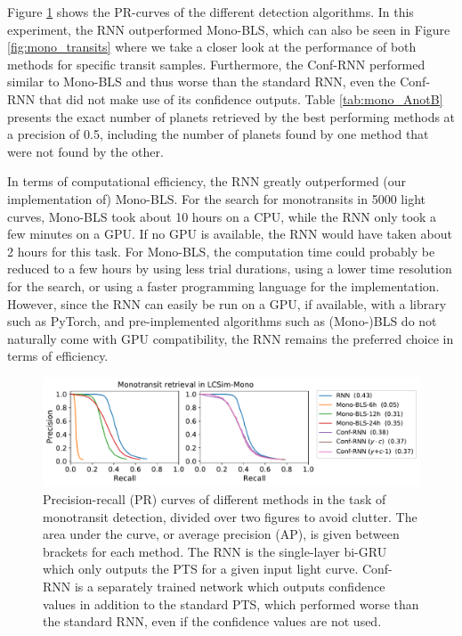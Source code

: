 Figure \ref{fig:mono_pr} shows the PR-curves of the different detection algorithms. In this experiment, the RNN outperformed Mono-BLS, which can also be seen in Figure \ref{fig:mono_transits} where we take a closer look at the performance of both methods for specific transit samples. Furthermore, the Conf-RNN performed similar to Mono-BLS and thus worse than the standard RNN, even the Conf-RNN that did not make use of its confidence outputs. Table \ref{tab:mono_AnotB} presents the exact number of planets retrieved by the best performing methods at a precision of 0.5, including the number of planets found by one method that were not found by the other.

In terms of computational efficiency, the RNN greatly outperformed (our implementation of) Mono-BLS. For the search for monotransits in 5000 light curves, Mono-BLS took about 10 hours on a CPU, while the RNN only took a few minutes on a GPU. If no GPU is available, the RNN would have taken about 2 hours for this task. For Mono-BLS, the computation time could probably be reduced to a few hours by using less trial durations, using a lower time resolution for the search, or using a faster programming language for the implementation. However, since the RNN can easily be run on a GPU, if available, with a library such as PyTorch, and pre-implemented algorithms such as (Mono-)BLS do not naturally come with GPU compatibility, the RNN remains the preferred choice in terms of efficiency.


\begin{figure}
    \centering
    \includegraphics[width=0.8\linewidth]{Experiments/Figures/Monos/mono_pr.pdf}
    \caption{Precision-recall (PR) curves of different methods in the task of monotransit detection, divided over two figures to avoid clutter. The area under the curve, or average precision (AP), is given between brackets for each method. The RNN is the single-layer bi-GRU which only outputs the PTS for a given input light curve. Conf-RNN is a separately trained network which outputs confidence values in addition to the standard PTS, which performed worse than the standard RNN, even if the confidence values are not used.}
    \label{fig:mono_pr}
\end{figure}

